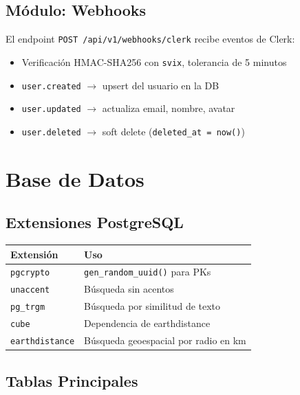 \documentclass[12pt,a4paper]{report}
\begin{document}
\section{M\'odulo: Webhooks}

El endpoint \texttt{POST /api/v1/webhooks/clerk} recibe eventos de Clerk:
\begin{itemize}[leftmargin=*]
  \item Verificaci\'on HMAC-SHA256 con \texttt{svix}, tolerancia de 5 minutos
  \item \texttt{user.created} $\rightarrow$ upsert del usuario en la DB
  \item \texttt{user.updated} $\rightarrow$ actualiza email, nombre, avatar
  \item \texttt{user.deleted} $\rightarrow$ soft delete (\texttt{deleted\_at = now()})
\end{itemize}

\chapter{Base de Datos}

\section{Extensiones PostgreSQL}

\begin{center}
\begin{tabular}{L{4cm} L{8cm}}
\toprule
\textbf{Extensi\'on} & \textbf{Uso} \\
\midrule
\texttt{pgcrypto} & \texttt{gen\_random\_uuid()} para PKs \\
\texttt{unaccent} & B\'usqueda sin acentos \\
\texttt{pg\_trgm} & B\'usqueda por similitud de texto \\
\texttt{cube} & Dependencia de earthdistance \\
\texttt{earthdistance} & B\'usqueda geoespacial por radio en km \\
\bottomrule
\end{tabular}
\end{center}

\section{Tablas Principales}
\end{document}
